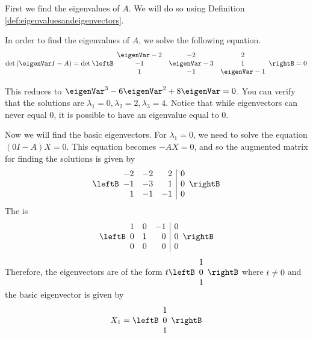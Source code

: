\begin{solution}
First we find the eigenvalues of $A$. We will do so using Definition
\ref{def:eigenvaluesandeigenvectors}. 

In order to find the eigenvalues of $A$, we solve the following equation.
\begin{equation*}
\det \left(\eigenVar I -A \right) =
\det  \leftB 
\begin{array}{ccc}
\eigenVar -2 & -2 & 2 \\
 -1 & \eigenVar - 3  & 1 \\
1 & -1 &  \eigenVar  -1 
\end{array}
\rightB
 =0
\end{equation*}

This reduces to $ \eigenVar^{3}-6 \eigenVar^{2}+8\eigenVar =0$. You can verify that the
solutions are $ \lambda_1 = 0, \lambda_2 = 2, \lambda_3 = 4$.
Notice that while eigenvectors can never equal $0$, it is possible to have an eigenvalue equal to $0$. 

Now we will find the basic eigenvectors. For $\lambda_1 =0$, we need to solve the equation
$\left( 0 I - A \right) X = 0$. This equation becomes $-AX=0$, and so the augmented matrix for finding
the solutions is given by 
\begin{equation*}
\leftB 
\begin{array}{rrr|r}
-2 & -2 & 2 & 0 \\
-1 & -3 & 1 & 0 \\
1 & -1 & -1 & 0
\end{array}
\rightB
\end{equation*}
The \rref \;is
\begin{equation*}
\leftB
\begin{array}{rrr|r}
1 & 0 & -1 & 0 \\
0 & 1 &  0 & 0 \\
0 & 0 &  0 & 0
\end{array}
\rightB
\end{equation*}
Therefore, the eigenvectors are of the form $ t\leftB
\begin{array}{r}
1 \\
0 \\
1
\end{array}
\rightB$ where $t\neq 0$ and the basic eigenvector is given by
\begin{equation*}
X_1
=
\leftB
\begin{array}{r}
1 \\
0 \\
1
\end{array}
\rightB
\end{equation*}


\end{solution}
